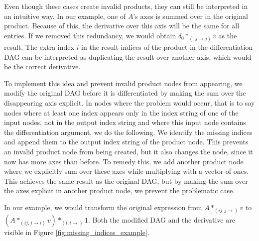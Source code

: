 \documentclass[12pt, a4paper]{report}
\begin{document}
Even though these cases create invalid products, they can still be interpreted in an intuitive way.
In our example, one of $A$'s axes is summed over in the original product.
Because of this, the derivative over this axis will be the same for all entries.
If we removed this redundancy, we would obtain $\delta_0 *_{(,j \rightarrow j)} v$ as the result.
The extra index $i$ in the result indices of the product in the differentiation DAG can be interpreted as duplicating the result over another axis, which would be the correct derivative.

To implement this idea and prevent invalid product nodes from appearing, we modify the original DAG before it is differentiated by making the sum over the disappearing axis explicit.
In nodes where the problem would occur, that is to say nodes where at least one index appears only in the index string of one of the input nodes, not in the output index string and where this input node contains the differentiation argument, we do the following.
We identify the missing indices and append them to the output index string of the product node.
This prevents an invalid product node from being created, but it also changes the node, since it now has more axes than before.
To remedy this, we add another product node where we explicitly sum over these axes while multiplying with a vector of ones.
This achieves the same result as the original DAG, but by making the sum over the axes explicit in another product node, we prevent the problematic case.

In our example, we would transform the original expression from $A *_{(ij,j \rightarrow )} v$ to $(A *_{(ij,j \rightarrow i)} v) *_{(i,i \rightarrow)} 1$.
Both the modified DAG and the derivative are visible in Figure \ref{fig:missing_indices_example}.
\end{document}
